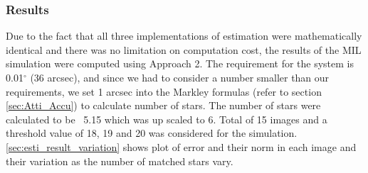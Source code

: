\documentclass[../../main.tex]{subfiles}
\begin{document}
{{{}


\subsubsection{Results}
{
Due to the fact that all three implementations of estimation were mathematically identical and there was no limitation on computation cost, the results of the MIL simulation were computed using Approach 2. The requirement for the system is 0.01$^\circ$ (36 arcsec), and since we had to consider a number smaller than our requirements, we set 1 arcsec into the Markley formulas (refer to section \ref{sec:Atti_Accu}) to calculate number of stars. The number of stars were calculated to be ~5.15 which was up scaled to 6. Total of 15 images and a threshold value of 18, 19 and 20 was considered for the simulation. \ref{sec:esti_result_variation} shows plot of error and their norm in each image and their variation as the number of matched stars vary.

}}}
\end{document}

